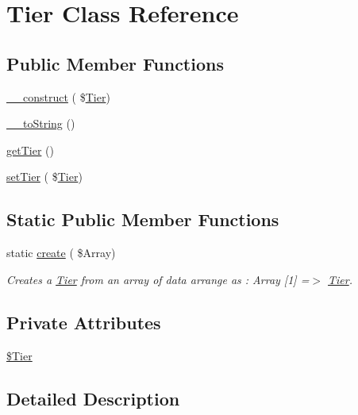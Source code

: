 \hypertarget{class_tier}{}\section{Tier Class Reference}
\label{class_tier}
\subsection*{Public Member Functions}
\begin{DoxyCompactItemize}
\item 
\hyperlink{class_tier_ac4cf20e52416a2045bbe2d613f3b4b2d}{\+\_\+\+\_\+construct} ( \$\hyperlink{class_tier}{Tier})
\item 
\hyperlink{class_tier_af7e66c68ef60ef2b529f91a3a8d6327a}{\+\_\+\+\_\+to\+String} ()
\item 
\hyperlink{class_tier_ab173f1e0c4652fc145f7d40368feaaea}{get\+Tier} ()
\item 
\hyperlink{class_tier_a5ea1c79ea5029e906d26985aa342ea47}{set\+Tier} ( \$\hyperlink{class_tier}{Tier})
\end{DoxyCompactItemize}
\subsection*{Static Public Member Functions}
\begin{DoxyCompactItemize}
\item 
static \hyperlink{class_tier_adf30a0aceb6cedf3b1a10712f8eba5a9}{create} ( \$Array)
\begin{DoxyCompactList}\small\item\em Creates a \hyperlink{class_tier}{Tier} from an array of data arrange as \+: Array \mbox{[}1\mbox{]} =$>$ \hyperlink{class_tier}{Tier}. \end{DoxyCompactList}\end{DoxyCompactItemize}
\subsection*{Private Attributes}
\begin{DoxyCompactItemize}
\item 
\hyperlink{class_tier_a6875b1a70100c0c109a2a88accd1246e}{\$\+Tier}
\end{DoxyCompactItemize}


\subsection{Detailed Description}



